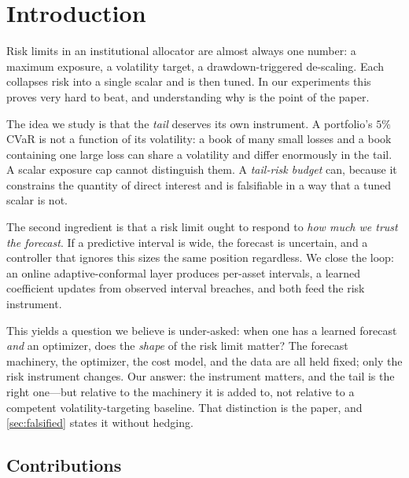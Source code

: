 \documentclass[journal]{IEEEtran}
\begin{document}
\section{Introduction}
\label{sec:intro}

Risk limits in an institutional allocator are almost always one number: a maximum
exposure, a volatility target, a drawdown-triggered de-scaling. Each collapses
risk into a single scalar and is then tuned. In our experiments this proves very
hard to beat, and understanding why is the point of the paper.

The idea we study is that the \emph{tail} deserves its own instrument. A
portfolio's $5\%$ CVaR is not a function of its volatility: a book of many small
losses and a book containing one large loss can share a volatility and differ
enormously in the tail. A scalar exposure cap cannot distinguish them. A
\emph{tail-risk budget} can, because it constrains the quantity of direct interest
and is falsifiable in a way that a tuned scalar is not.

The second ingredient is that a risk limit ought to respond to \emph{how much we
trust the forecast}. If a predictive interval is wide, the forecast is uncertain,
and a controller that ignores this sizes the same position regardless. We close
the loop: an online adaptive-conformal layer produces per-asset intervals, a
learned coefficient updates from observed interval breaches, and both feed the
risk instrument.

This yields a question we believe is under-asked: when one has a learned forecast
\emph{and} an optimizer, does the \emph{shape} of the risk limit matter? The
forecast machinery, the optimizer, the cost model, and the data are all held
fixed; only the risk instrument changes. Our answer: the instrument matters, and
the tail is the right one---but relative to the machinery it is added to, not
relative to a competent volatility-targeting baseline. That distinction is the
paper, and \cref{sec:falsified} states it without hedging.

\subsection{Contributions}
\label{sec:contrib}
\end{document}
